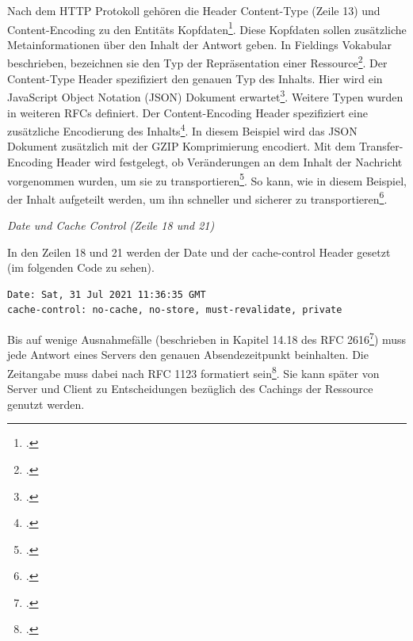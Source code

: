 Nach dem HTTP Protokoll gehören die Header Content-Type (Zeile 13) und Content-Encoding zu den Entitäts Kopfdaten\footcite[S. 42]{fielding_hypertext_1999}. Diese Kopfdaten sollen zusätzliche Metainformationen über den Inhalt der Antwort geben. In Fieldings Vokabular beschrieben, bezeichnen sie den Typ der Repräsentation einer Ressource\footcite[S. 88ff]{fielding_architectural_2000}. Der Content-Type Header spezifiziert den genauen Typ des Inhalts. Hier wird ein JavaScript Object Notation (JSON) Dokument erwartet\footcite[S. 1]{crockford_applicationjson_2006}. Weitere Typen wurden in weiteren RFCs definiert. Der Content-Encoding Header spezifiziert eine zusätzliche Encodierung des Inhalts\footcite[S. 168]{berners-lee_univeral_1996}. In diesem Beispiel wird das JSON Dokument zusätzlich mit der GZIP Komprimierung encodiert. Mit dem Transfer-Encoding Header wird festgelegt, ob Veränderungen an dem Inhalt der Nachricht vorgenommen wurden, um sie zu transportieren\footcite[S. 143]{berners-lee_univeral_1996}. So kann, wie in diesem Beispiel, der Inhalt aufgeteilt werden, um ihn schneller und sicherer zu transportieren\footcite[S. 143]{berners-lee_univeral_1996}.

\emph{Date und Cache Control (Zeile 18 und 21)}

In den Zeilen 18 und 21 werden der Date und der cache-control Header gesetzt (im folgenden Code zu sehen).

\lstset{firstnumber=13}
\begin{lstlisting}
Date: Sat, 31 Jul 2021 11:36:35 GMT
cache-control: no-cache, no-store, must-revalidate, private
\end{lstlisting}

Bis auf wenige Ausnahmefälle (beschrieben in Kapitel 14.18 des RFC 2616\footcite[S. 124]{berners-lee_univeral_1996}) muss jede Antwort eines Servers den genauen Absendezeitpunkt beinhalten. Die Zeitangabe muss dabei nach RFC 1123 formatiert sein\footcite[S. 124]{berners-lee_univeral_1996}. Sie kann später von Server und Client zu Entscheidungen bezüglich des Cachings der Ressource genutzt werden.

